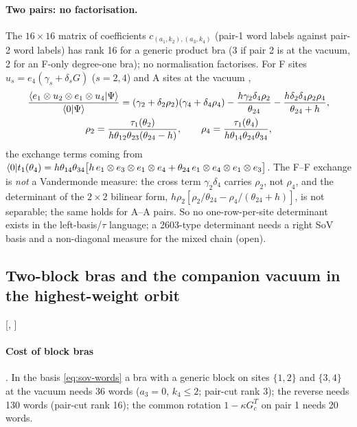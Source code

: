 \paragraph{Two pairs: no factorisation.} The $16\times16$ matrix of coefficients $c_{(a_1,k_2),(a_3,k_4)}$ (pair-1 word labels against pair-2 word labels) has rank 16 for a generic product bra (3 if pair 2
is at the vacuum, 2 for an F-only degree-one bra); no normalisation factorises. For F sites $u_s=e_4(\gamma_s+\delta_sG)$ ($s=2,4$) and A sites at the vacuum \ex,
\begin{multline}\label{eq:sov-FF}
 \frac{\langle e_1\otimes u_2\otimes e_1\otimes u_4|\Psi\rangle}{\langle0|\Psi\rangle}=(\gamma_2+\delta_2\rho_2)(\gamma_4+\delta_4\rho_4)-\frac{h\gamma_2\delta_4\rho_2}{\theta_{24}}-\frac{h\delta_2\delta_4\rho_2\rho_4}{\theta_{24}+h},\\
 \rho_2=\frac{\tau_1(\theta_2)}{h\theta_{12}\theta_{23}(\theta_{24}-h)},\qquad\rho_4=\frac{\tau_1(\theta_4)}{h\theta_{14}\theta_{24}\theta_{34}},
\end{multline}
the exchange terms coming from $\langle0|t_1(\theta_4)=h\theta_{14}\theta_{34}\big[h\,e_1\otimes e_3\otimes e_1\otimes e_4+\theta_{24}\,e_1\otimes e_4\otimes e_1\otimes e_3\big]$. The F--F exchange is
\emph{not} a Vandermonde measure: the cross term $\gamma_2\delta_4$ carries $\rho_2$, not $\rho_4$, and the determinant of the $2\times2$ bilinear form, $h\rho_2[\rho_2/\theta_{24}-\rho_4/(\theta_{24}+h)]$, is
not separable; the same holds for A--A pairs. So no one-row-per-site determinant exists in the left-basis/$\tau$ language; a 2603-type determinant needs a right SoV basis and a non-diagonal measure
for the mixed chain (open).

\subsection{Two-block bras and the companion vacuum in the highest-weight orbit}\label{sec:sov-twoblock}

[, ]

\paragraph{Cost of block bras} \ex. In the basis \eqref{eq:sov-words} a bra with a generic block on sites $\{1,2\}$ and $\{3,4\}$ at the vacuum needs 36 words ($a_3=0$, $k_4\le2$; pair-cut rank 3);
the reverse needs 130 words (pair-cut rank 16); the common rotation $1-\kappa G_c^T$ on pair 1 needs 20 words.


